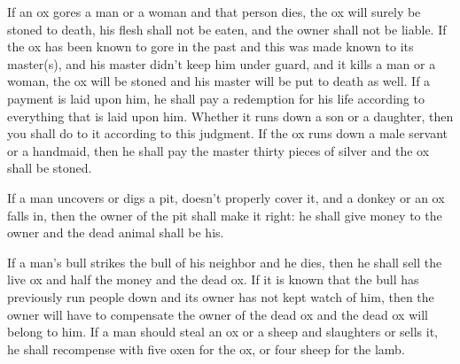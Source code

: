 \begin{inparaenum}
     If an ox gores a man or a woman and that person dies, the ox will surely be stoned to death, his flesh shall not be eaten, and the owner shall not be liable.%
     If the ox has been known to gore in the past and this was made known to its master(s), and his master didn't keep him under guard, and it kills a man or a woman, the ox will be stoned and his master will be put to death as well.%
     If a payment is laid upon him, he shall pay a redemption for his life according to everything that is laid upon him.%
     Whether it runs down a son or a daughter, then you shall do to it according to this judgment.%
     If the ox runs down a male servant or a handmaid, then he shall pay the master thirty pieces of silver and the ox shall be stoned.%
    
     If a man uncovers or digs a pit, doesn't properly cover it, and a donkey or an ox falls in,%
     then the owner of the pit shall make it right: he shall give money to the owner and the dead animal shall be his.%
    
     If a man's bull strikes the bull of his neighbor and he dies, then he shall sell the live ox and half the money and the dead ox.%
     If it is known that the bull has previously run people down and its owner has not kept watch of him, then the owner will have to compensate the owner of the dead ox and the dead ox will belong to him.%
     If a man should steal an ox or a sheep and slaughters or sells it, he shall recompense with five oxen for the ox, or four sheep for the lamb.%
\end{inparaenum}
